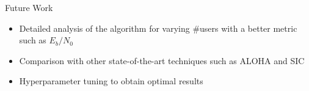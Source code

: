 \documentclass[aspectratio=169, handout, 10pt, hyperref=colorlinks]{beamer}
\begin{document}
 \begin{frame}{Future Work}
     \begin{itemize}
         \item Detailed analysis of the algorithm for varying \#users with a better metric such as $E_b/N_0$
         \item Comparison with other state-of-the-art techniques such as ALOHA and SIC
         \item Hyperparameter tuning to obtain optimal results
     \end{itemize}
 \end{frame}


    
       
\end{document}
